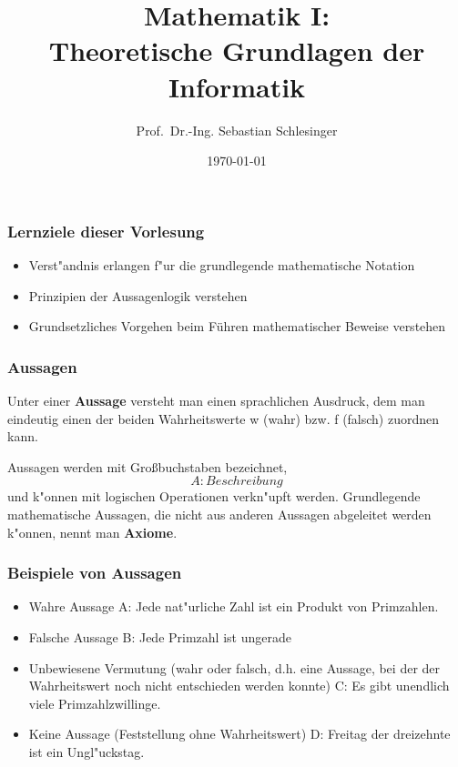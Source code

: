 \documentclass{beamer}
\title{Mathematik I: \\Theoretische Grundlagen der Informatik}
\author{Prof.\ Dr.-Ing. Sebastian Schlesinger}
\date{\today}
\begin{document}
 \begin{frame}
\titlepage
\end{frame}
\begin{frame}
\frametitle{Lernziele dieser Vorlesung}
 
\begin{itemize}
\item Verst"andnis erlangen f"ur die grundlegende mathematische Notation
\item Prinzipien der Aussagenlogik verstehen
\item Grundsetzliches Vorgehen beim F\"uhren mathematischer Beweise verstehen
\end{itemize}
\end{frame}
 
\begin{frame}
\frametitle{Aussagen}

Unter einer \textbf{Aussage} versteht man einen sprachlichen Ausdruck, dem man eindeutig einen der beiden Wahrheitswerte w (\glqq wahr\grqq) bzw. f (\glqq falsch\grqq) zuordnen kann. 

Aussagen werden mit Gro\ss buchstaben bezeichnet, \[A:Beschreibung\]
und k"onnen mit logischen Operationen verkn"upft werden. Grundlegende mathematische Aussagen, die nicht aus anderen Aussagen abgeleitet werden k"onnen, nennt man \textbf{Axiome}.
\end{frame}

\begin{frame}
  \frametitle{Beispiele von Aussagen}
  \begin{itemize}
    \item Wahre Aussage A: Jede nat"urliche Zahl ist ein Produkt von Primzahlen.
    \item Falsche Aussage B: Jede Primzahl ist ungerade
    \item Unbewiesene Vermutung (wahr oder falsch, d.h. eine Aussage, bei der der Wahrheitswert noch nicht entschieden werden konnte) C: Es gibt unendlich viele Primzahlzwillinge.
    \item Keine Aussage (Feststellung ohne Wahrheitswert) D: Freitag der dreizehnte ist ein Ungl"uckstag.
  \end{itemize}
      
\end{frame}
\end{document}
